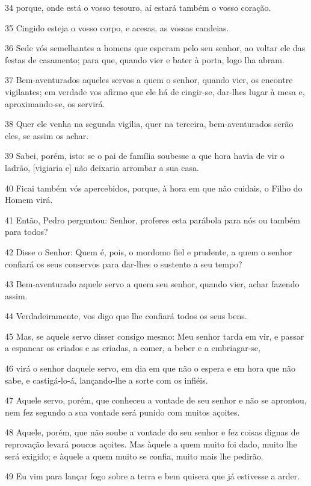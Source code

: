 \par 34 porque, onde está o vosso tesouro, aí estará também o vosso coração.
\par 35 Cingido esteja o vosso corpo, e acesas, as vossas candeias.
\par 36 Sede vós semelhantes a homens que esperam pelo seu senhor, ao voltar ele das festas de casamento; para que, quando vier e bater à porta, logo lha abram.
\par 37 Bem-aventurados aqueles servos a quem o senhor, quando vier, os encontre vigilantes; em verdade vos afirmo que ele há de cingir-se, dar-lhes lugar à mesa e, aproximando-se, os servirá.
\par 38 Quer ele venha na segunda vigília, quer na terceira, bem-aventurados serão eles, se assim os achar.
\par 39 Sabei, porém, isto: se o pai de família soubesse a que hora havia de vir o ladrão, [vigiaria e] não deixaria arrombar a sua casa.
\par 40 Ficai também vós apercebidos, porque, à hora em que não cuidais, o Filho do Homem virá.
\par 41 Então, Pedro perguntou: Senhor, proferes esta parábola para nós ou também para todos?
\par 42 Disse o Senhor: Quem é, pois, o mordomo fiel e prudente, a quem o senhor confiará os seus conservos para dar-lhes o sustento a seu tempo?
\par 43 Bem-aventurado aquele servo a quem seu senhor, quando vier, achar fazendo assim.
\par 44 Verdadeiramente, vos digo que lhe confiará todos os seus bens.
\par 45 Mas, se aquele servo disser consigo mesmo: Meu senhor tarda em vir, e passar a espancar os criados e as criadas, a comer, a beber e a embriagar-se,
\par 46 virá o senhor daquele servo, em dia em que não o espera e em hora que não sabe, e castigá-lo-á, lançando-lhe a sorte com os infiéis.
\par 47 Aquele servo, porém, que conheceu a vontade de seu senhor e não se aprontou, nem fez segundo a sua vontade será punido com muitos açoites.
\par 48 Aquele, porém, que não soube a vontade do seu senhor e fez coisas dignas de reprovação levará poucos açoites. Mas àquele a quem muito foi dado, muito lhe será exigido; e àquele a quem muito se confia, muito mais lhe pedirão.
\par 49 Eu vim para lançar fogo sobre a terra e bem quisera que já estivesse a arder.
